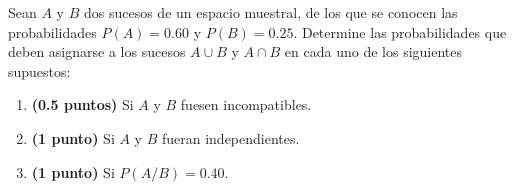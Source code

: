 
Sean $A$ y $B$ dos sucesos de un espacio muestral, de los que se conocen las probabilidades $P(A)=0.60$ y $P(B)=0.25$. Determine las probabilidades que deben asignarse a los sucesos $A\cup B$ y $A\cap B$ en cada uno de los siguientes supuestos:
\begin{enumerate}[label=\alph*)]
\item \textbf{(0.5 puntos)} Si $A$ y $B$ fuesen incompatibles.
\item \textbf{(1 punto)} Si $A$ y $B$ fueran independientes.
\item \textbf{(1 punto)} Si $P(A/B)=0.40$.
\end{enumerate}
